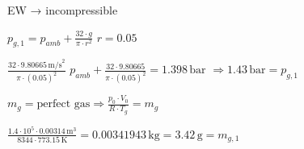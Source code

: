 EW → incompressible  

\( p_{g,1} = p_{amb} + \frac{32 \cdot g}{\pi \cdot r^2} \)  
\( r = 0.05 \)  

\( \frac{32 \cdot 9.80665 \, \text{m/s}^2}{\pi \cdot (0.05)^2} \)  
\( p_{amb} + \frac{32 \cdot 9.80665}{\pi \cdot (0.05)^2} = 1.398 \, \text{bar} \)  
\( \Rightarrow 1.43 \, \text{bar} = p_{g,1} \)  

\( m_g = \text{perfect gas} \Rightarrow \frac{p_0 \cdot V_0}{R \cdot T_g} = m_g \)  

\( \frac{1.4 \cdot 10^5 \cdot 0.00314 \, \text{m}^3}{8344 \cdot 773.15 \, \text{K}} = 0.00341943 \, \text{kg} = 3.42 \, \text{g} = m_{g,1} \)
